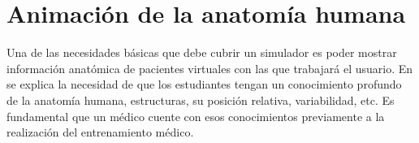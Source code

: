 \section{Animación de la anatomía humana} 
\label{art:anatomy}



Una de las necesidades básicas que debe cubrir un simulador es poder mostrar información anatómica de pacientes virtuales con las que trabajará el usuario. En  \cite{preim2018survey} se explica la necesidad de que los estudiantes tengan un conocimiento profundo de la anatomía humana, estructuras, su posición relativa, variabilidad, etc. Es fundamental que un médico cuente con esos conocimientos previamente a la realización del entrenamiento médico.



